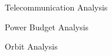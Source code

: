 \begin{frame}{Telecommunication Analysis}


\end{frame}

\begin{frame}{Power Budget Analysis}


\end{frame}

\begin{frame}{Orbit Analysis}


\end{frame}
